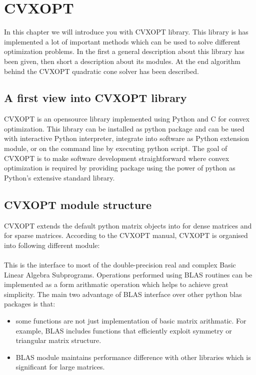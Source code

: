 
\chapter{CVXOPT} %

\label{ChapterX} %

In this chapter we will introduce you with CVXOPT library. This library is has implemented a lot of important methods which can be used to solve different optimization problems. In the first a general description about this library has been given, then short a description about its modules. At the end algorithm behind the CVXOPT quadratic cone solver has been described.
  
\section{A first view into CVXOPT library}

CVXOPT is an opensource  library implemented using Python and C for convex optimization. This library can be installed as python package and can be used with interactive Python interpreter, integrate into software as Python extension module, or on the command line by executing python script. The goal of CVXOPT is to make software development straightforward where convex optimization is required by providing package using the power of python as Python's extensive standard library.


\section{CVXOPT module structure}
CVXOPT extends the default python matrix objects into  for dense matrices and  for sparse matrices. According to the CVXOPT manual, CVXOPT is organised into following different module:

\subsubsection*{}
This is the interface to most of the double-precision real and complex  Basic Linear Algebra Subprograms. Operations performed using BLAS routines can be implemented as a form arithmatic operation which helps to achieve great simplicity. The main two advantage of BLAS interface over other python blas packages is that:
\begin{itemize}
	\item some functions are not just implementation of basic matrix arithmatic. For example, BLAS includes functions that efficiently exploit symmetry or triangular matrix structure.
	\item BLAS module maintains performance difference with other libraries which is significant for large matrices.
\end{itemize}


